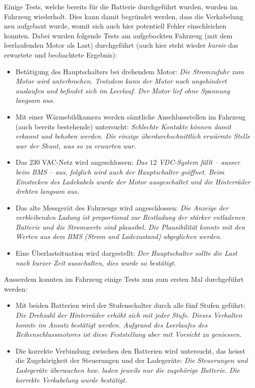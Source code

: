 \color{blue} Einige Tests, welche bereits für die Batterie durchgeführt wurden, wurden im Fahrzeug wiederholt. Dies kann damit begründet werden, dass die Verkabelung neu aufgebaut wurde, womit sich auch hier potentiell Fehler einschleichen konnten. Dabei wurden folgende Tests am aufgebockten Fahrzeug (mit dem leerlaufenden Motor als Last) durchgeführt (auch hier steht wieder \textit{kursiv} das erwartete und beobachtete Ergebnis): \begin{itemize}
	\item Betätigung des Hauptschalters bei drehendem Motor: \textit{Die Stromzufuhr zum Motor wird unterbrochen. Trotzdem kann der Motor noch ungehindert auslaufen und befindet sich im Leerlauf. Der Motor lief ohne Spannung langsam aus.}
	\item Mit einer Wärmebildkamera werden sämtliche Anschlussstellen im Fahrzeug (auch bereits bestehende) untersucht: \textit{Schlechte Kontakte können damit erkannt und behoben werden. Die einzige überdurchschnittlich erwärmte Stelle war der Shunt, was so zu erwarten war.}
	\item Das $230$ VAC-Netz wird angeschlossen: \textit{Das $12$ VDC-System fällt -- ausser beim BMS -- aus, folglich wird auch der Hauptschalter geöffnet. Beim Einstecken des Ladekabels wurde der Motor ausgeschaltet und die Hinterräder drehten langsam aus.}
	\item Das alte Messgerät des Fahrzeugs wird angeschlossen: \textit{Die Anzeige der verbleibenden Ladung ist proportional zur Restladung der stärker entladenen Batterie und die Stromwerte sind plausibel. Die Plausibilität konnte mit den Werten aus dem BMS (Strom und Ladezustand) abgeglichen werden.}
	\item Eine Überlastsituation wird dargestellt: \textit{Der Hauptschalter sollte die Last nach kurzer Zeit ausschalten, dies wurde so bestätigt.}
\end{itemize}

Ausserdem konnten im Fahrzeug einige Tests nun zum ersten Mal durchgeführt werden: \begin{itemize}
	\item Mit beiden Batterien wird der Stufenschalter durch alle fünf Stufen geführt: \textit{Die Drehzahl der Hinterräder erhöht sich mit jeder Stufe. Dieses Verhalten konnte im Ansatz bestätigt werden. Aufgrund des Leerlaufes des Reihenschlussmotores ist diese Feststellung aber mit Vorsicht zu geniessen.}
	\item Die korrekte Verbindung zwischen den Batterien wird untersucht, das heisst die Zugehörigkeit der Steuerungen und der Ladegeräte: \textit{Die Steuerungen und Ladegeräte überwachen bzw. laden jeweils nur die zugehörige Batterie. Die korrekte Verkabelung wurde bestätigt.}
\end{itemize}

